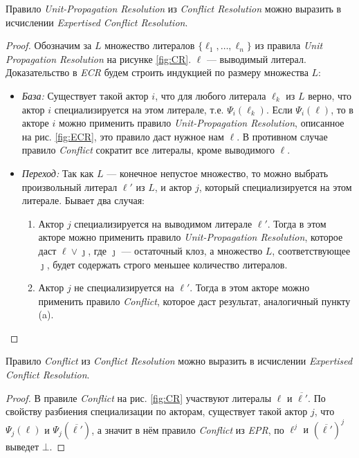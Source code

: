 \begin{lemma}
\label{lem:upr}
Правило \emph{Unit-Propagation Resolution} из \emph{Conflict Resolution} можно выразить в исчислении \emph{Expertised Conflict Resolution}.
\end{lemma}
\begin{proof}
Обозначим за $L$ множество литералов $\{\ell_1, \ldots, \ell_n\}$ из правила \emph{Unit Propagation Resolution} на рисунке \ref{fig:CR}. $\ell$ --- выводимый литерал.
Доказательство в \emph{ECR} будем строить индукцией по размеру множества $L$:
\begin{itemize}[label=$\star$]
	\item \emph{База:} Существует такой актор $i$, что для любого литерала $\ell_k$ из $L$ верно, что актор $i$ специализируется на этом литерале, т.е. $\Psi_i(\ell_k)$. Если $\Psi_i(\ell)$, то в акторе $i$ можно применить правило \emph{Unit-Propagation Resolution}, описанное на рис. \ref{fig:ECR}, это правило даст нужное нам $\ell$. В противном случае правило \emph{Conflict} сократит все литералы, кроме выводимого $\ell$.
    \item \emph{Переход:} Так как $L$ --- конечное непустое множество, то можно выбрать произвольный литерал $\ell'$ из $L$, и актор $j$, который специализируется на этом литерале. Бывает два случая:
    \begin{enumerate}
    	\item Актор $j$ специализируется на выводимом литерале $\ell'$. Тогда в этом акторе можно применить правило \emph{Unit-Propagation Resolution}, которое даст $\ell \vee \jmath$, где $\jmath$ --- остаточный клоз, а множество $L$, соответствующее $\jmath$, будет содержать строго меньшее количество литералов.
        \item Актор $j$ не специализируется на $\ell'$. Тогда в этом акторе можно применить правило \emph{Conflict}, которое даст результат, аналогичный пункту (a).
    \end{enumerate} 
\end{itemize}
\end{proof}

\begin{lemma}
\label{lem:confl}
Правило \emph{Conflict} из \emph{Conflict Resolution} можно выразить в исчислении \emph{Expertised Conflict Resolution}.
\end{lemma}
\begin{proof}
В правиле \emph{Conflict} на рис. \ref{fig:CR} участвуют литералы $\ell$ и $\overline{\ell'}$. По свойству разбиения специализации по акторам, существует такой актор $j$, что $\Psi_j(\ell)$ и $\Psi_j(\overline{\ell'})$, а значит в нём правило \emph{Conflict} из \emph{EPR}, по $\ell^j\text{ и }(\overline{\ell'})^j$ выведет $\bot$.
\end{proof}

